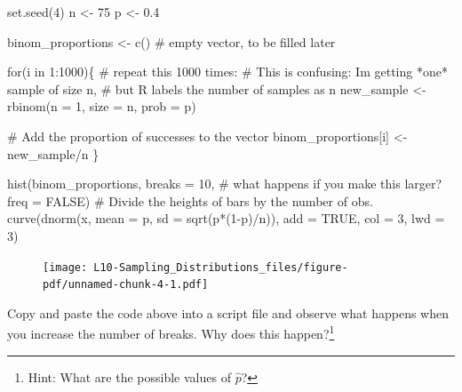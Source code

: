 \documentclass[
  letterpaper,
  DIV=11,
  numbers=noendperiod]{scrreprt}
\newenvironment{Shaded}{\begin{snugshade}}{\end{snugshade}}
\newcommand{\AttributeTok}[1]{\textcolor[rgb]{0.40,0.45,0.13}{#1}}
\newcommand{\CommentTok}[1]{\textcolor[rgb]{0.37,0.37,0.37}{#1}}
\newcommand{\ConstantTok}[1]{\textcolor[rgb]{0.56,0.35,0.01}{#1}}
\newcommand{\ControlFlowTok}[1]{\textcolor[rgb]{0.00,0.23,0.31}{#1}}
\newcommand{\DecValTok}[1]{\textcolor[rgb]{0.68,0.00,0.00}{#1}}
\newcommand{\FloatTok}[1]{\textcolor[rgb]{0.68,0.00,0.00}{#1}}
\newcommand{\FunctionTok}[1]{\textcolor[rgb]{0.28,0.35,0.67}{#1}}
\newcommand{\NormalTok}[1]{\textcolor[rgb]{0.00,0.23,0.31}{#1}}
\newcommand{\OtherTok}[1]{\textcolor[rgb]{0.00,0.23,0.31}{#1}}
\newcommand{\SpecialCharTok}[1]{\textcolor[rgb]{0.37,0.37,0.37}{#1}}
\begin{document}
\begin{Shaded}
\begin{Highlighting}[]
\FunctionTok{set.seed}\NormalTok{(}\DecValTok{4}\NormalTok{)}
\NormalTok{n }\OtherTok{\textless{}{-}} \DecValTok{75}
\NormalTok{p }\OtherTok{\textless{}{-}} \FloatTok{0.4}

\NormalTok{binom\_proportions }\OtherTok{\textless{}{-}} \FunctionTok{c}\NormalTok{() }\CommentTok{\# empty vector, to be filled later}

\ControlFlowTok{for}\NormalTok{(i }\ControlFlowTok{in} \DecValTok{1}\SpecialCharTok{:}\DecValTok{1000}\NormalTok{)\{ }\CommentTok{\# repeat this 1000 times:}
    \CommentTok{\# This is confusing: I\textquotesingle{}m getting *one* sample of size n,}
    \CommentTok{\# but R labels the number of samples as n}
\NormalTok{    new\_sample }\OtherTok{\textless{}{-}} \FunctionTok{rbinom}\NormalTok{(}\AttributeTok{n =} \DecValTok{1}\NormalTok{, }\AttributeTok{size =}\NormalTok{ n, }\AttributeTok{prob =}\NormalTok{ p)}
    
    \CommentTok{\# Add the proportion of successes to the vector}
\NormalTok{    binom\_proportions[i] }\OtherTok{\textless{}{-}}\NormalTok{ new\_sample}\SpecialCharTok{/}\NormalTok{n}
\NormalTok{\}}

\FunctionTok{hist}\NormalTok{(binom\_proportions, }
    \AttributeTok{breaks =} \DecValTok{10}\NormalTok{, }\CommentTok{\# what happens if you make this larger?}
    \AttributeTok{freq =} \ConstantTok{FALSE}\NormalTok{) }\CommentTok{\# Divide the heights of bars by the number of obs.}
\FunctionTok{curve}\NormalTok{(}\FunctionTok{dnorm}\NormalTok{(x, }\AttributeTok{mean =}\NormalTok{ p, }\AttributeTok{sd =} \FunctionTok{sqrt}\NormalTok{(p}\SpecialCharTok{*}\NormalTok{(}\DecValTok{1}\SpecialCharTok{{-}}\NormalTok{p)}\SpecialCharTok{/}\NormalTok{n)), }\AttributeTok{add =} \ConstantTok{TRUE}\NormalTok{, }\AttributeTok{col =} \DecValTok{3}\NormalTok{, }\AttributeTok{lwd =} \DecValTok{3}\NormalTok{)}
\end{Highlighting}
\end{Shaded}

\begin{figure}[H]

{\centering \texttt{[image: L10-Sampling\_Distributions\_files/figure-pdf/unnamed-chunk-4-1.pdf]}

}

\end{figure}

Copy and paste the code above into a script file and observe what
happens when you increase the number of breaks. Why does this
happen?\footnote{Hint: What are the possible values of \(\hat p\)?}
\end{document}
